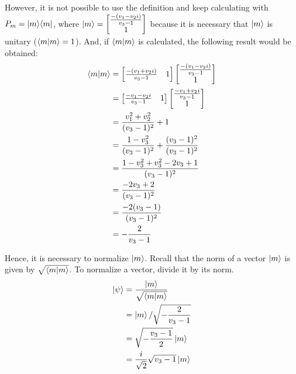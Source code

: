 However, it is not possible to use the definition
and keep calculating with $P_m = \mathop{\mathinner{ |{m}\rangle \langle{m}|}}$,
where $\ket{m} = \left[ \begin{matrix}
        \frac{-(v_1 - v_2i)}{v_3 - 1} \\ 1
    \end{matrix} \right]$
because it is necessary that $\ket{m}$ is unitary
($\mathop{\mathinner{ \langle{m}|{m}\rangle}} = 1$).
And, if $\mathop{\mathinner{ \langle{m}|{m}\rangle}}$ is calculated, the following
result would be obtained:
\begin{align}
    \mathop{\mathinner{ \langle{m}|{m}\rangle}} &= \left[ \begin{matrix}
        \frac{-(v_1 + v_2i)}{v_3 - 1} & 1
        \end{matrix} \right]
        \left[ \begin{matrix}
            \frac{-(v_1 - v_2i)}{v_3 - 1} \\ 1
        \end{matrix} \right] \\
    &= \left[ \begin{matrix}
        \frac{-v_1 - v_2i}{v_3 - 1} & 1
        \end{matrix} \right]
        \left[ \begin{matrix}
            \frac{-v_1 + v_2i}{v_3 - 1} \\ 1
        \end{matrix} \right] \\
    &= \frac{v_1^2 + v_2^2}{(v_3 - 1)^2} + 1 \\
    &= \frac{1 - v_3^2}{{(v_3 - 1)^2}} +
        \frac{{(v_3 - 1)^2}}{{(v_3 - 1)^2}} \\
    &= \frac{1 - v_3^2 + v_3^2 - 2v_3 + 1}
        {(v_3 - 1)^2} \\
    &= \frac{-2v_3 + 2}{(v_3 - 1)^2} \\
    &= \frac{-2 (v_3 - 1)}{(v_3 - 1)^2} \\
    &= - \frac{2}{v_3 - 1}
\end{align}

Hence, it is necessary to normalize $\ket{m}$.
Recall that the norm of a vector $\ket{m}$ is given by
$\sqrt{\mathop{\mathinner{ \langle{m}|{m}\rangle}}}$.
To normalize a vector, divide it by its norm.
\begin{align}
    \ket{\psi} &= \frac{\ket{m}}{\sqrt{\mathop{\mathinner{ \langle{m}|{m}\rangle}}}} \\
    &= \ket{m} / \sqrt{- \frac{2}{v_3 - 1}} \\
    &= \sqrt{- \frac{v_3 - 1}{2}} \ket{m} \\
    &= \frac{i}{\sqrt2} \sqrt{v_3 - 1} \ket{m}
\end{align}

